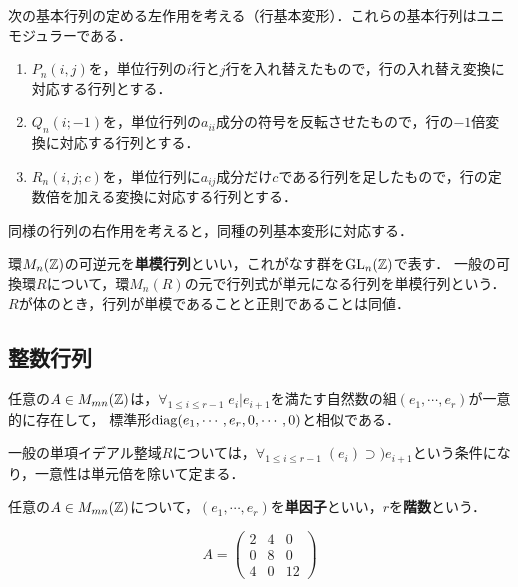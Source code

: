 \documentclass[uplatex,dvipdfmx]{jsreport}
\begin{document}
\begin{notation}
    次の基本行列の定める左作用を考える（行基本変形）．これらの基本行列はユニモジュラーである．
    \begin{enumerate}
        \item $P_n(i,j)$を，単位行列の$i$行と$j$行を入れ替えたもので，行の入れ替え変換に対応する行列とする．
        \item $Q_n(i;-1)$を，単位行列の$a_{ii}$成分の符号を反転させたもので，行の$-1$倍変換に対応する行列とする．
        \item $R_n(i,j;c)$を，単位行列に$a_{ij}$成分だけ$c$である行列を足したもので，行の定数倍を加える変換に対応する行列とする．
    \end{enumerate}
    同様の行列の右作用を考えると，同種の列基本変形に対応する．
\end{notation}

\begin{definition}[unimodular]
    環$M_n(\mathbb{Z})$の可逆元を\textbf{単模行列}といい，これがなす群を$\mathrm{GL}_n(\mathbb{Z})$で表す．
    一般の可換環$R$について，環$M_n(R)$の元で行列式が単元になる行列を単模行列という．
    $R$が体のとき，行列が単模であることと正則であることは同値．
\end{definition}

\subsection{整数行列}

\begin{theorem}
    任意の$A\in M_{mn}(\mathbb{Z})$は，$\forall_{1\le i\le r-1}\;e_i|e_{i+1}$を満たす自然数の組$(e_1,\cdots,e_r)$が一意的に存在して，
    標準形$\mathrm{diag}(e_1,\cdots,e_r,0,\cdots,0)$と相似である．
\end{theorem}
\begin{remark}
    一般の単項イデアル整域$R$については，$\forall_{1\le i\le r-1}\;(e_i)\supset)e_{i+1}$という条件になり，一意性は単元倍を除いて定まる．
\end{remark}

\begin{definition}
    任意の$A\in M_{mn}(\mathbb{Z})$について，$(e_1,\cdots,e_r)$を\textbf{単因子}といい，$r$を\textbf{階数}という．
\end{definition}

\begin{example}
    \[A=\begin{pmatrix}2&4&0\\0&8&0\\4&0&12\end{pmatrix}\]
\end{example}
\end{document}

